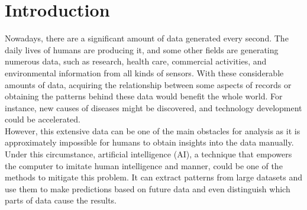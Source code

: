 \documentclass[12pt,twoside]{report}
\date{June 2022}
\begin{document}



\clearpage{\pagestyle{empty}\cleardoublepage}
\setcounter{page}{1}
\pagestyle{plain}


\cleardoublepage

\clearpage{\pagestyle{empty}\cleardoublepage}

\tableofcontents 


\clearpage{\pagestyle{empty}\cleardoublepage}
\setcounter{page}{1}
\fancyhead[LE,RO]{\slshape \rightmark}
\fancyhead[LO,RE]{\slshape \leftmark}

\chapter{Introduction}

Nowadays, there are a significant amount of data generated every second. The daily lives of humans are producing it, and some other fields are generating numerous data, such as research, health care, commercial activities, and environmental information from all kinds of sensors. With these considerable amounts of data,  acquiring the relationship between some aspects of records or obtaining the patterns behind these data would benefit the whole world. For instance, new causes of diseases might be discovered, and technology development could be accelerated.
\\

However, this extensive data can be one of the main obstacles for analysis as it is approximately impossible for humans to obtain insights into the data manually. Under this circumstance, artificial intelligence (AI), a technique that empowers the computer to imitate human intelligence and manner,  could be one of the methods to mitigate this problem. It can extract patterns from large datasets and use them to make predictions based on future data and even distinguish which parts of data cause the results.
\\
\end{document}
